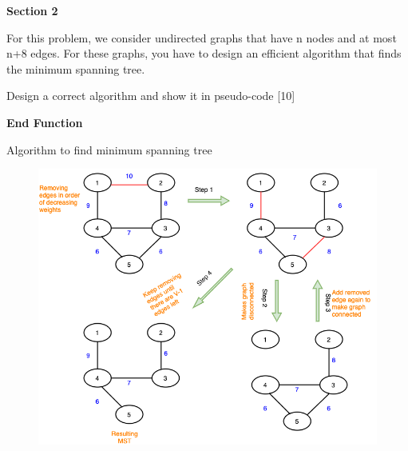 \documentclass[12pt,letterpaper, onecolumn]{exam}
\begin{document}
    \begingroup
        \centering
        \LARGE \textbf{Section 2}\\
    \endgroup
\vspace{16pt}
\par For this problem, we consider undirected graphs that have n nodes and at most n+8 edges. For these graphs, you have to design an efficient algorithm that finds the minimum spanning tree.
\begin{questions}
\question Design a correct algorithm and show it in pseudo-code [10]\droppoints
\begin{solution}
    \begin{algorithm}[H]
        \vspace{12pt}
        \textbf{End Function}
        \caption{Algorithm to find minimum spanning tree}
        \label{MinimumSpanningTreeAlgo} 
        \end{algorithm}
\end{solution}
        \begin{figure}
            \centering
            \includegraphics[width=14cm]{mstalgo.png}

\end{figure}
\end{questions}
\end{document}
